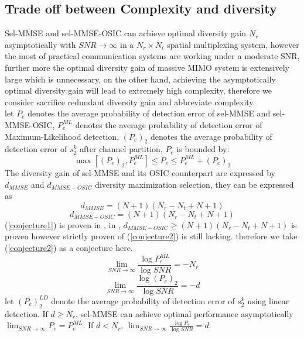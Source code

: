 \documentclass[12pt,a4paper,final]{article}
\begin{document}
\begin{spacing}{2.5}
\section{Trade off between Complexity and diversity}
Sel-MMSE and sel-MMSE-OSIC can achieve optimal diversity gain $N_{r}$ asymptotically \cite{6} \cite{9} with $SNR\to \infty$ in a $N_{r}\times N_{t}$ spatial multiplexing system\cite{2}, however the most of practical communication systems are working under a moderate SNR, further more the optimal diversity gain of massive MIMO system is extensively large which is unnecessary, on the other hand, achieving the asymptotically optimal diversity gain will lead to extremely high complexity, therefore we consider sacrifice redundant diversity gain and abbreviate complexity.\\
let $P_{e}$ denotes the average probability of detection error of sel-MMSE and sel-MMSE-OSIC, $P_{e}^{ML}$ denotes the average probability of detection error of Maximum-Likelihood detection, $(P_{e})_{2}$ denotes the average probability of detection error of $s_{2}^{k}$ after channel partition, $P_{e}$ is bounded by\cite{2}:
\begin{equation}
\max[(P_{e})_{2},P_{e}^{ML}]\leq P_{e} \leq P_{e}^{ML}+(P_{e})_{2}\label{equation16}
\end{equation}
The diversity gain of sel-MMSE and its OSIC counterpart are expressed by $d_{MMSE}$ and $d_{MMSE-OSIC}$ diversity maximization selection, they can be expressed as\cite{2}
\begin{equation}
d_{MMSE}=(N+1)(N_{r}-N_{t}+N+1)  \label{conjecture1}
\end{equation}
\begin{equation}
d_{MMSE-OSIC}=(N+1)(N_{r}-N_{t}+N+1)\label{conjecture2}
\end{equation}
(\ref{conjecture1}) is proven in \cite{9}, in \cite{2}, $d_{MMSE-OSIC}\geq (N+1)(N_{r}-N_{t}+N+1)$ is proven however strictly proven of (\ref{conjecture2}) is still lacking. therefore we take (\ref{conjecture2}) as a conjecture here.
\begin{equation}
\lim_{SNR\rightarrow \infty}\frac{\log{P_{e}^{ML}}}{\log{SNR}}=-N_{r}
\end{equation}   
\begin{equation}
\lim_{SNR\rightarrow \infty}\frac{\log{(P_{e})_{2}}}{\log{SNR}}=-d
\end{equation}
let $(P_{e})_{2}^{LD}$ denote the average probability of detection error of $s_{2}^{k}$ using linear detection.
If $d\geq N_{r}$, sel-MMSE can achieve optimal performance asymptotically $\lim_{SNR\rightarrow \infty}P_{e}=P_{e}^{ML}$. If $d<N_{r}$, $\lim_{SNR\rightarrow \infty}\frac{\log{P_{e}}}{\log{SNR}}=d$\cite{2}.

\end{spacing}
\end{document}
